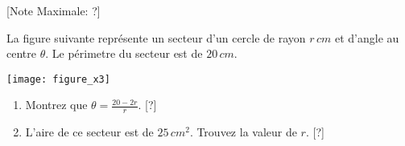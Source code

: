 \begin{question}
  \hspace*{\fill} [Note Maximale: ?]\par
  \medskip
  \noindent La figure suivante représente un secteur d'un cercle de rayon $r\,cm$ et d'angle au centre $\theta$. Le périmetre du secteur est de $20\,cm$.\par
  \medskip
  \begin{center} %
    \texttt{[image: figure\_x3]}\par
  \end{center} %
  \begin{enumerate}[label=(\alph*)]
    \item Montrez que $\theta = \frac{20 - 2r}{r}$.\hspace*{\fill} [?]
    \item L'aire de ce secteur est de $25\,cm^2$. Trouvez la valeur de $r$.\hspace*{\fill} [?]
  \end{enumerate}
\end{question}
